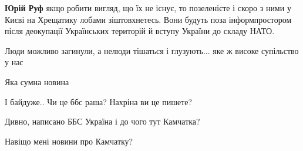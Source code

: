 \begin{itemize}
\begin{itemize}
 
\textbf{Юрій Руф} якщо робити вигляд, що їх не існує, то позеленієте і скоро з
ними у Києві на Хрещатику лобами зіштовхнетесь. Вони будуть поза
інформпростором після деокупації Українських територій й вступу України до
складу НАТО.
\end{itemize}

 
Люди можливо загинули, а нелюди тішаться і глузують... яке ж високе супільство у нас

 
Яка сумна новина

 
І байдуже.. Чи це ббс раша?
Нахріна ви це пишете?

 
Дивно, написано ББС Україна і до чого тут Камчатка?

 
Навіщо мені новини про Камчатку? 🙈🙈🙈



\end{itemize}
